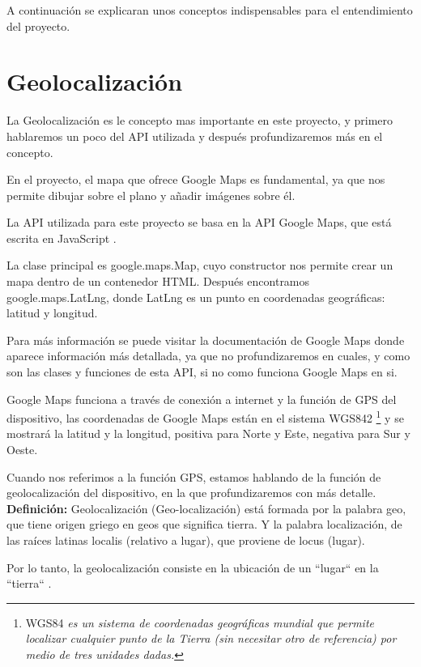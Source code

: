 
A continuación se explicaran unos conceptos indispensables para el entendimiento del proyecto.
\section{Geolocalización}\label{geolocalizacion}
La Geolocalización es le concepto mas importante en este proyecto, y primero hablaremos un poco del API utilizada y después profundizaremos más en el concepto.

En el proyecto, el mapa que ofrece Google Maps es fundamental, ya que nos permite dibujar sobre el plano y añadir imágenes 
sobre él.

La API utilizada para este proyecto se basa en la API Google Maps, que está escrita en JavaScript \cite{googlemapsjs}.

La clase principal es google.maps.Map, cuyo constructor nos permite crear un mapa dentro de un contenedor HTML. Después encontramos google.maps.LatLng, donde LatLng es un punto en coordenadas geográficas: latitud y longitud.

Para más información se puede visitar la documentación de Google Maps donde aparece información más detallada, ya que no profundizaremos en cuales, y como son las clases y funciones de esta API, si no como funciona Google Maps en si.

Google Maps funciona a través de conexión a internet y la función de GPS del dispositivo, las coordenadas de Google Maps están en el sistema WGS842 \footnote{WGS84 \textit{es un sistema de coordenadas geográficas mundial que permite localizar cualquier punto de la Tierra (sin necesitar otro de referencia) por medio de tres unidades dadas.}} y se mostrará la latitud y la longitud, positiva para Norte y Este, negativa para Sur y Oeste.

Cuando nos referimos a la función GPS, estamos hablando de la función de geolocalización del dispositivo, en la que profundizaremos con más detalle.
\\

\textbf{Definición:} Geolocalización (Geo-localización) está formada por la palabra geo, que tiene origen griego en geos que significa tierra. Y la palabra localización, de las raíces latinas localis  (relativo a lugar), que proviene de locus (lugar).

Por lo tanto, la geolocalización consiste en la ubicación de un ``lugar`` en la ``tierra`` \cite{diccionarioetim}. 

